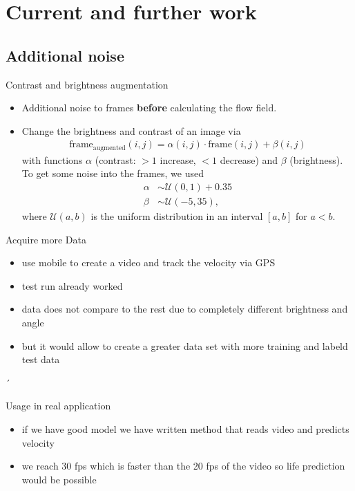 \section{Current and further work}
\subsection{Additional noise}
\begin{frame}{Contrast and brightness augmentation}
\begin{itemize}
\item Additional noise to frames \textbf{before} calculating the flow field.
\item Change the brightness and contrast of an image via
\begin{align*}
\text{frame}_{\mathrm{augmented}}(i,j) = \alpha(i,j) \cdot \text{frame}(i,j) + \beta(i,j)
\end{align*}
with functions $\alpha$ (contrast: $>1$ increase, $<1$ decrease) and $\beta$ (brightness).\\
To get some noise into the frames, we used
\begin{align*}
\alpha &\sim \mathcal{U}(0,1)+0.35\\
\beta &\sim \mathcal{U}(-5,35),
\end{align*}
where $\mathcal{U}(a,b)$ is the uniform distribution in an interval $[a,b]$ for $a < b$.
\end{itemize}
\end{frame}

\begin{frame}{Acquire more Data}
\begin{itemize}
	\item use mobile to create a video and track the velocity via GPS
	\item test run already worked
	\item data does not compare to the rest due to completely different brightness and angle
	\item but it would allow to create a greater data set with more training and labeld test data
\end{itemize}´
\end{frame}

\begin{frame}{Usage in real application}
	\begin{itemize}
		\item if we have good model we have written method that reads video and predicts velocity
		\item we reach 30 fps which is faster than the 20 fps of the video so life prediction would be possible
	\end{itemize}
\end{frame}


